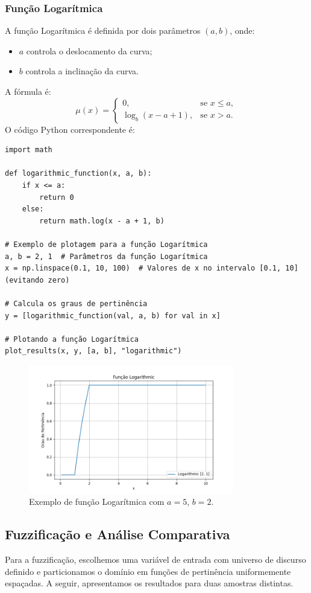 \documentclass[a4paper,12pt]{article}
\begin{document}
\subsubsection{Função Logarítmica}
A função Logarítmica é definida por dois parâmetros $(a, b)$, onde:
\begin{itemize}
    \item $a$ controla o deslocamento da curva;
    \item $b$ controla a inclinação da curva.
\end{itemize}
A fórmula é:
\[
\mu(x) = 
\begin{cases}
0, & \text{se } x \leq a, \\
\log_b(x - a + 1), & \text{se } x > a.
\end{cases}
\]
O código Python correspondente é:
\begin{verbatim}
import math

def logarithmic_function(x, a, b):
    if x <= a:
        return 0
    else:
        return math.log(x - a + 1, b)

# Exemplo de plotagem para a função Logarítmica
a, b = 2, 1  # Parâmetros da função Logarítmica
x = np.linspace(0.1, 10, 100)  # Valores de x no intervalo [0.1, 10] (evitando zero)

# Calcula os graus de pertinência
y = [logarithmic_function(val, a, b) for val in x]

# Plotando a função Logarítmica
plot_results(x, y, [a, b], "logarithmic")
\end{verbatim}
\begin{figure}[H]
    \centering
    \includegraphics[width=0.8\textwidth]{img/logarithmic.png}
    \caption{Exemplo de função Logarítmica com $a=5$, $b=2$.}
\end{figure}


\subsection{Fuzzificação e Análise Comparativa}
Para a fuzzificação, escolhemos uma variável de entrada com universo de discurso definido e particionamos o domínio em funções de pertinência uniformemente espaçadas. A seguir, apresentamos os resultados para duas amostras distintas.
\end{document}
